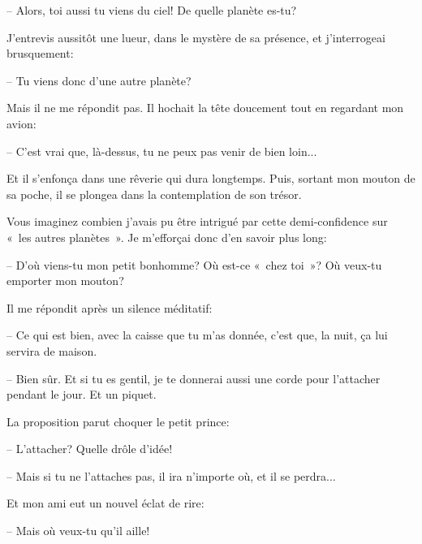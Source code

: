 \documentclass[a4paper]{report}
\begin{document}
-- Alors, toi aussi tu viens du ciel! De quelle planète es-tu?

J'entrevis aussitôt une lueur, dans le mystère de sa présence, et j'interrogeai brusquement:

-- Tu viens donc d'une autre planète?

Mais il ne me répondit pas. Il hochait la tête doucement tout en regardant mon avion:

-- C'est vrai que, là-dessus, tu ne peux pas venir de bien loin...


Et il s'enfonça dans une rêverie qui dura longtemps. Puis, sortant mon mouton de sa poche, il se plongea dans la contemplation de son trésor.

Vous imaginez combien j'avais pu être intrigué par cette demi-confidence sur «~les autres planètes~». Je m'efforçai donc d'en savoir plus long:

-- D'où viens-tu mon petit bonhomme? Où est-ce «~chez toi~»? Où veux-tu emporter mon mouton?

Il me répondit après un silence méditatif:

-- Ce qui est bien, avec la caisse que tu m'as donnée, c'est que, la nuit, ça lui servira de maison.

-- Bien sûr. Et si tu es gentil, je te donnerai aussi une corde pour l'attacher pendant le jour. Et un piquet.

La proposition parut choquer le petit prince:

-- L'attacher? Quelle drôle d'idée!

-- Mais si tu ne l'attaches pas, il ira n'importe où, et il se perdra...

Et mon ami eut un nouvel éclat de rire:

-- Mais où veux-tu qu'il aille!
\end{document}
